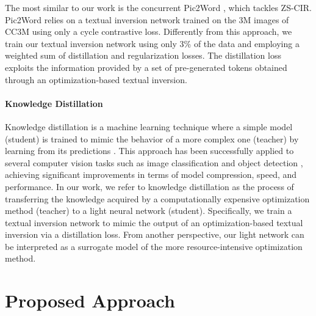 \documentclass[10pt,twocolumn,letterpaper]{article}
\begin{document}
The most similar to our work is the concurrent Pic2Word \cite{saito2023pic2word}, which tackles ZS-CIR. Pic2Word relies on a textual inversion network trained on the 3M images of CC3M \cite{sharma2018conceptual} using only a cycle contrastive loss. Differently from this approach, we train our textual inversion network using only 3\% of the data and employing a weighted sum of distillation and regularization losses. The distillation loss exploits the information provided by a set of pre-generated tokens obtained through an optimization-based textual inversion. 

\paragraph{Knowledge Distillation}
Knowledge distillation is a machine learning technique where a simple model (student) is trained to mimic the behavior of a more complex one (teacher) by learning from its predictions \cite{hinton2015distilling}. This approach has been successfully applied to several computer vision tasks such as image classification \cite{hinton2015distilling, romero2014fitnets} and object detection \cite{chen2017learning}, achieving significant improvements in terms of model compression, speed, and performance. In our work, we refer to knowledge distillation as the process of transferring the knowledge acquired by a computationally expensive optimization method (teacher) to a light neural network (student). Specifically, we train a textual inversion network to mimic the output of an optimization-based textual inversion via a distillation loss. From another perspective, our light network can be interpreted as a surrogate model of the more resource-intensive optimization method.

\section{Proposed Approach} \label{sec:proposed_approach}
\end{document}
